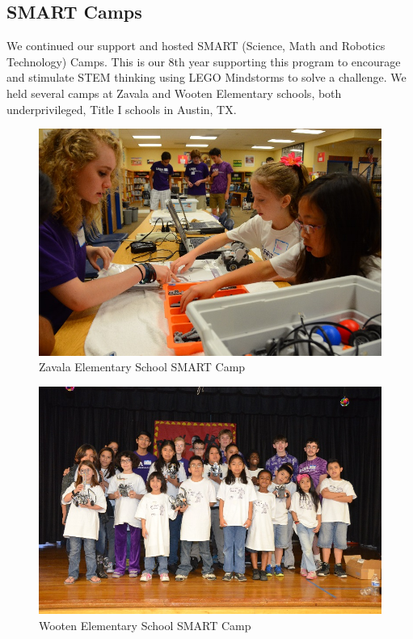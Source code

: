 \subsection{SMART Camps}
We continued our support and hosted SMART (Science, Math and Robotics Technology) Camps.  This is our 8th year supporting this program to encourage and stimulate STEM thinking using LEGO Mindstorms to solve a challenge.  We held several camps at Zavala and Wooten Elementary schools, both underprivileged, Title I schools in Austin, TX.\\
\begin{figure}[H]
	\centering
	\includegraphics[height=0.8\linewidth]{smart}
	\caption[]{Zavala Elementary School SMART Camp}
	\label{fig:smart}
\end{figure}
\begin{figure}[H]
	\centering
	\includegraphics[height=0.8\linewidth]{smart1}
	\caption[]{Wooten Elementary School SMART Camp}
	\label{fig:smart1}
\end{figure}

